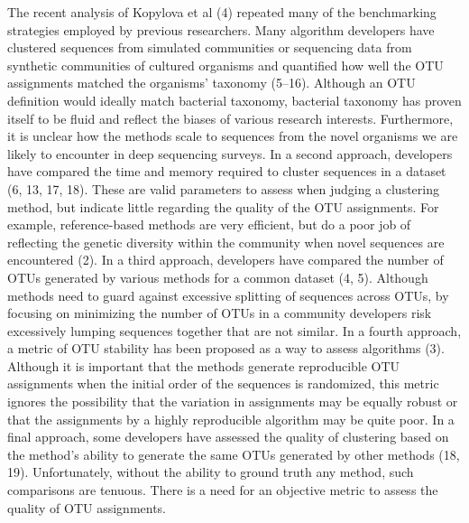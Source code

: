 \documentclass[11pt,]{article}
\begin{document}
The recent analysis of Kopylova et al (4) repeated many of the
benchmarking strategies employed by previous researchers. Many algorithm
developers have clustered sequences from simulated communities or
sequencing data from synthetic communities of cultured organisms and
quantified how well the OTU assignments matched the organisms' taxonomy
(5--16). Although an OTU definition would ideally match bacterial
taxonomy, bacterial taxonomy has proven itself to be fluid and reflect
the biases of various research interests. Furthermore, it is unclear how
the methods scale to sequences from the novel organisms we are likely to
encounter in deep sequencing surveys. In a second approach, developers
have compared the time and memory required to cluster sequences in a
dataset (6, 13, 17, 18). These are valid parameters to assess when
judging a clustering method, but indicate little regarding the quality
of the OTU assignments. For example, reference-based methods are very
efficient, but do a poor job of reflecting the genetic diversity within
the community when novel sequences are encountered (2). In a third
approach, developers have compared the number of OTUs generated by
various methods for a common dataset (4, 5). Although methods need to
guard against excessive splitting of sequences across OTUs, by focusing
on minimizing the number of OTUs in a community developers risk
excessively lumping sequences together that are not similar. In a fourth
approach, a metric of OTU stability has been proposed as a way to assess
algorithms (3). Although it is important that the methods generate
reproducible OTU assignments when the initial order of the sequences is
randomized, this metric ignores the possibility that the variation in
assignments may be equally robust or that the assignments by a highly
reproducible algorithm may be quite poor. In a final approach, some
developers have assessed the quality of clustering based on the method's
ability to generate the same OTUs generated by other methods (18, 19).
Unfortunately, without the ability to ground truth any method, such
comparisons are tenuous. There is a need for an objective metric to
assess the quality of OTU assignments.
\end{document}
